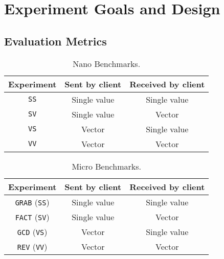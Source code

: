 \documentclass{sig-alternate}
\begin{document}
\section{Experiment Goals and Design}
\label{sec:exper-goals-design}

\subsection{Evaluation Metrics}
\label{sec:evmet}

\begin{table}[t]

  \begin{center}
  \begin{tabular}{| c | c | c |}
  \hline
  Experiment & Sent by client & Received by client \\
  \hline
  \texttt{SS} & Single value & Single value \\
  \texttt{SV} & Single value & Vector \\
  \texttt{VS} & Vector & Single value \\
  \texttt{VV} & Vector & Vector \\
  \hline
  \end{tabular}
\end{center}

  \vspace*{-.1in}
  \caption{Nano Benchmarks.}\label{tab:baselines}

\end{table}

\begin{table}[t]

  \begin{center}
  \begin{tabular}{| c | c | c |}
  \hline
  Experiment & Sent by client & Received by client \\
  \hline
  \texttt{GRAB} ({\tt SS}) & Single value & Single value \\
  \texttt{FACT} ({\tt SV}) & Single value & Vector \\
  \texttt{GCD}  ({\tt VS}) & Vector & Single value \\
  \texttt{REV}  ({\tt VV}) & Vector & Vector \\
  \hline
  \end{tabular}
\end{center}

  \vspace*{-.1in}
  \caption{Micro Benchmarks.}\label{tab:realworlds}
  \vspace*{-.2in}

\end{table}
\end{document}

